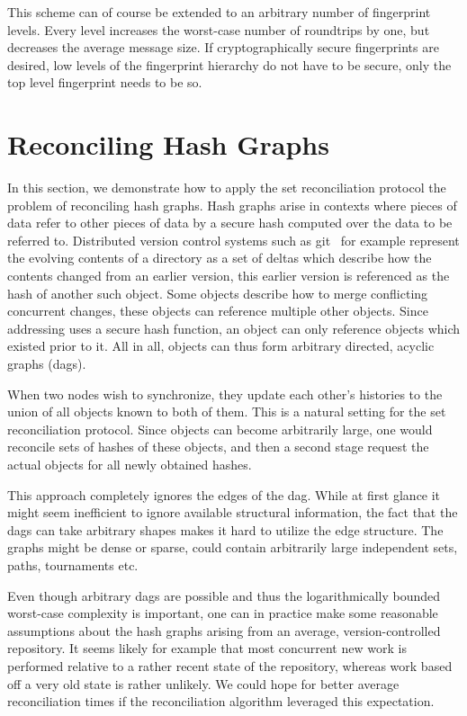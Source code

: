 This scheme can of course be extended to an arbitrary number of fingerprint levels. Every level increases the worst-case number of roundtrips by one, but decreases the average message size. If cryptographically secure fingerprints are desired, low levels of the fingerprint hierarchy do not have to be secure, only the top level fingerprint needs to be so.

\section{Reconciling Hash Graphs}
\label{set-reconciliation-graphs}

In this section, we demonstrate how to apply the set reconciliation protocol the problem of reconciling hash graphs. Hash graphs arise in contexts where pieces of data refer to other pieces of data by a secure hash computed over the data to be referred to. Distributed version control systems such as git~\cite{chacon2014pro} for example represent the evolving contents of a directory as a set of deltas which describe how the contents changed from an earlier version, this earlier version is referenced as the hash of another such object. Some objects describe how to merge conflicting concurrent changes, these objects can reference multiple other objects. Since addressing uses a secure hash function, an object can only reference objects which existed prior to it. All in all, objects can thus form arbitrary directed, acyclic graphs (dags).

When two nodes wish to synchronize, they update each other's histories to the union of all objects known to both of them. This is a natural setting for the set reconciliation protocol. Since objects can become arbitrarily large, one would reconcile sets of hashes of these objects, and then a second stage request the actual objects for all newly obtained hashes.

This approach completely ignores the edges of the dag. While at first glance it might seem inefficient to ignore available structural information, the fact that the dags can take arbitrary shapes makes it hard to utilize the edge structure. The graphs might be dense or sparse, could contain arbitrarily large independent sets, paths, tournaments etc.

Even though arbitrary dags are possible and thus the logarithmically bounded worst-case complexity is important, one can in practice make some reasonable assumptions about the hash graphs arising from an average, version-controlled repository. It seems likely for example that most concurrent new work is performed relative to a rather recent state of the repository, whereas work based off a very old state is rather unlikely. We could hope for better average reconciliation times if the reconciliation algorithm leveraged this expectation.

